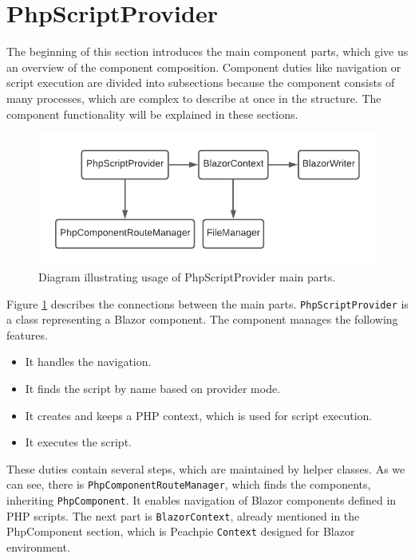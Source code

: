 \section{PhpScriptProvider}

The beginning of this section introduces the main component parts, which give us an overview of the component composition.
Component duties like navigation or script execution are divided into subsections because the component consists of many processes, which are complex to describe at once in the structure.
The component functionality will be explained in these sections.
\par
\begin{figure}[b!]
\centering
\includegraphics[scale=0.8]{./img/PhpScriptProvider}
\caption{Diagram illustrating usage of PhpScriptProvider main parts.}
\label{img18:provider}
\end{figure}
\par
Figure \ref{img18:provider} describes the connections between the main parts.
\texttt{PhpScript\-Provider} is a class representing a Blazor component.
The component manages the following features.
\par
\begin{itemize}
\item It handles the navigation.
\item It finds the script by name based on provider mode.
\item It creates and keeps a PHP context, which is used for script execution.
\item It executes the script.
\end{itemize}
\par
These duties contain several steps, which are maintained by helper classes.
As we can see, there is \texttt{PhpComponentRouteManager}, which finds the components, inheriting \texttt{PhpComponent}.
It enables navigation of Blazor components defined in PHP scripts.
The next part is \texttt{BlazorContext}, already mentioned in the PhpComponent section, which is Peachpie \texttt{Context} designed for Blazor environment.
